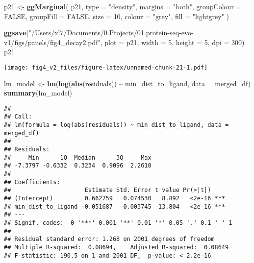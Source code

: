 \documentclass[
]{article}
\newenvironment{Shaded}{\begin{snugshade}}{\end{snugshade}}
\newcommand{\AttributeTok}[1]{\textcolor[rgb]{0.13,0.29,0.53}{#1}}
\newcommand{\ConstantTok}[1]{\textcolor[rgb]{0.56,0.35,0.01}{#1}}
\newcommand{\DecValTok}[1]{\textcolor[rgb]{0.00,0.00,0.81}{#1}}
\newcommand{\FunctionTok}[1]{\textcolor[rgb]{0.13,0.29,0.53}{\textbf{#1}}}
\newcommand{\NormalTok}[1]{#1}
\newcommand{\OtherTok}[1]{\textcolor[rgb]{0.56,0.35,0.01}{#1}}
\newcommand{\SpecialCharTok}[1]{\textcolor[rgb]{0.81,0.36,0.00}{\textbf{#1}}}
\newcommand{\StringTok}[1]{\textcolor[rgb]{0.31,0.60,0.02}{#1}}
\begin{document}
\begin{Shaded}
\begin{Highlighting}[]
\NormalTok{p21 }\OtherTok{\textless{}{-}} \FunctionTok{ggMarginal}\NormalTok{(}
\NormalTok{  p21,}
  \AttributeTok{type =} \StringTok{"density"}\NormalTok{,}
  \AttributeTok{margins =} \StringTok{"both"}\NormalTok{,}
  \AttributeTok{groupColour =} \ConstantTok{FALSE}\NormalTok{,}
  \AttributeTok{groupFill =} \ConstantTok{FALSE}\NormalTok{,}
  \AttributeTok{size =} \DecValTok{10}\NormalTok{,}
  \AttributeTok{colour =} \StringTok{"grey"}\NormalTok{,}
  \AttributeTok{fill =} \StringTok{"lightgrey"}
\NormalTok{)}

\FunctionTok{ggsave}\NormalTok{(}\StringTok{"/Users/xl7/Documents/0.Projects/01.protein{-}seq{-}evo{-}v1/figs/panels/fig4\_decay2.pdf"}\NormalTok{, }
       \AttributeTok{plot =}\NormalTok{ p21, }\AttributeTok{width =} \DecValTok{5}\NormalTok{, }\AttributeTok{height =} \DecValTok{5}\NormalTok{, }\AttributeTok{dpi =} \DecValTok{300}\NormalTok{)}
\NormalTok{p21}
\end{Highlighting}
\end{Shaded}

\texttt{[image: fig4\_v2\_files/figure-latex/unnamed-chunk-21-1.pdf]}

\begin{Shaded}
\begin{Highlighting}[]
\NormalTok{lm\_model }\OtherTok{\textless{}{-}} \FunctionTok{lm}\NormalTok{(}\FunctionTok{log}\NormalTok{(}\FunctionTok{abs}\NormalTok{(residuals)) }\SpecialCharTok{\textasciitilde{}}\NormalTok{ min\_dist\_to\_ligand, }\AttributeTok{data =}\NormalTok{ merged\_df)}
\FunctionTok{summary}\NormalTok{(lm\_model)}
\end{Highlighting}
\end{Shaded}

\begin{verbatim}
## 
## Call:
## lm(formula = log(abs(residuals)) ~ min_dist_to_ligand, data = merged_df)
## 
## Residuals:
##     Min      1Q  Median      3Q     Max 
## -7.3797 -0.6332  0.3234  0.9096  2.2610 
## 
## Coefficients:
##                     Estimate Std. Error t value Pr(>|t|)    
## (Intercept)         0.662759   0.074530   8.892   <2e-16 ***
## min_dist_to_ligand -0.051687   0.003745 -13.804   <2e-16 ***
## ---
## Signif. codes:  0 '***' 0.001 '**' 0.01 '*' 0.05 '.' 0.1 ' ' 1
## 
## Residual standard error: 1.268 on 2001 degrees of freedom
## Multiple R-squared:  0.08694,    Adjusted R-squared:  0.08649 
## F-statistic: 190.5 on 1 and 2001 DF,  p-value: < 2.2e-16
\end{verbatim}
\end{document}
